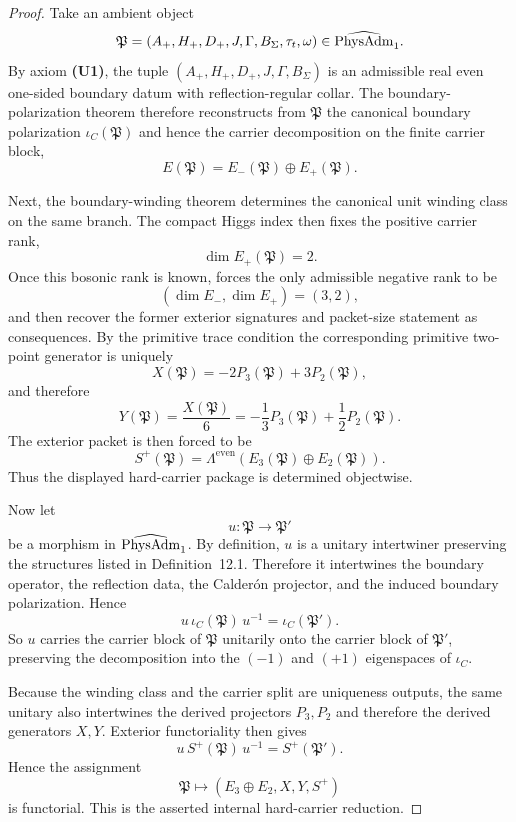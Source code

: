 \begin{proof}
Take an ambient object
\[
\mathfrak P=(A_+,H_+,D_+,J,\Gamma,B_\Sigma,\tau_t,\omega)\in\widehat{\mathrm{PhysAdm}}_1.
\]
By axiom \textbf{(U1)}, the tuple $(A_+,H_+,D_+,J,\Gamma,B_\Sigma)$ is an admissible real even
one-sided boundary datum with reflection-regular collar. The boundary-polarization theorem
therefore reconstructs from $\mathfrak P$ the canonical boundary polarization $\iota_C(\mathfrak
P)$ and hence the carrier decomposition on the finite carrier block,
\[
E(\mathfrak P)=E_-(\mathfrak P)\oplus E_+(\mathfrak P).
\]

Next, the boundary-winding theorem determines the canonical unit winding class on the same branch.
The compact Higgs index then fixes the positive carrier rank,
\[
\dim E_+(\mathfrak P)=2.
\]
Once this bosonic rank is known,  forces the only admissible negative
rank to be
\[
(\dim E_-,\dim E_+)=(3,2),
\]
and  then recover the former exterior
signatures and packet-size statement as consequences. By the primitive trace condition the
corresponding primitive two-point generator is uniquely
\[
X(\mathfrak P)=-2P_3(\mathfrak P)+3P_2(\mathfrak P),
\]
and therefore
\[
Y(\mathfrak P)=\frac{X(\mathfrak P)}6=-\frac13P_3(\mathfrak P)+\frac12P_2(\mathfrak P).
\]
The exterior packet is then forced to be
\[
S^+(\mathfrak P)=\Lambda^{\mathrm{even}}(E_3(\mathfrak P)\oplus E_2(\mathfrak P)).
\]
Thus the displayed hard-carrier package is determined objectwise.

Now let
\[
u:\mathfrak P\to \mathfrak P'
\]
be a morphism in $\widehat{\mathrm{PhysAdm}}_1$. By definition, $u$ is a unitary intertwiner preserving the
structures listed in Definition~12.1. Therefore it intertwines the boundary operator, the
reflection data, the Calder\'on projector, and the induced boundary polarization. Hence
\[
u\,\iota_C(\mathfrak P)\,u^{-1}=\iota_C(\mathfrak P').
\]
So $u$ carries the carrier block of $\mathfrak P$ unitarily onto the carrier block of $\mathfrak
P'$, preserving the decomposition into the $(-1)$ and $(+1)$ eigenspaces of $\iota_C$.

Because the winding class and the carrier split are uniqueness outputs, the same unitary also
intertwines the derived projectors $P_3,P_2$ and therefore the derived generators $X,Y$. Exterior
functoriality then gives
\[
u\,S^+(\mathfrak P)\,u^{-1}=S^+(\mathfrak P').
\]
Hence the assignment
\[
\mathfrak P\longmapsto (E_3\oplus E_2,X,Y,S^+)
\]
is functorial. This is the asserted internal hard-carrier reduction.
\end{proof}

